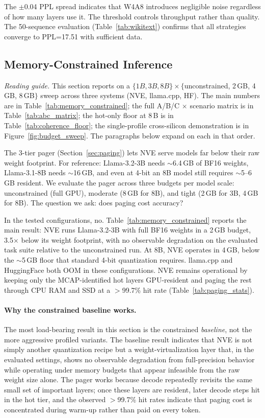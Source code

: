 \documentclass{article}
\begin{document}
The $\pm$0.04 PPL spread indicates that W4A8 introduces negligible noise
regardless of how many layers use it. The threshold controls throughput
rather than quality. The 50-sequence evaluation
(Table~\ref{tab:wikitext}) confirms that all strategies converge to
PPL=17.51 with sufficient data.


\subsection{Memory-Constrained Inference}
\label{sec:memory}

\emph{Reading guide.} This section reports on a $\{1B, 3B, 8B\} \times \{$unconstrained,
2\,GB, 4\,GB, 8\,GB$\}$ sweep across three systems (NVE, llama.cpp, HF). The main
numbers are in Table~\ref{tab:memory_constrained}; the full A/B/C $\times$ scenario
matrix is in Table~\ref{tab:abc_matrix}; the hot-only floor at 8\,B is in
Table~\ref{tab:coherence_floor}; the single-profile cross-silicon demonstration is in
Figure~\ref{fig:budget_sweep}. The paragraphs below expand on each in that order.

The 3-tier pager (Section~\ref{sec:paging}) lets NVE serve models far below their raw weight
footprint. For reference: Llama-3.2-3B needs $\sim$6.4\,GB of BF16 weights, Llama-3.1-8B
needs $\sim$16\,GB, and even at 4-bit an 8B model still requires $\sim$5--6\,GB
resident. We evaluate the pager across three budgets per model scale:
unconstrained (full GPU), moderate (8\,GB for 8B), and tight (2\,GB for 3B,
4\,GB for 8B). The question we ask: does paging cost accuracy?

In the tested configurations, no. Table~\ref{tab:memory_constrained} reports
the main result: NVE runs Llama-3.2-3B with full BF16 weights in a 2\,GB
budget, 3.5$\times$ below its weight footprint, with no observable
degradation on the evaluated task suite relative to the unconstrained run. At 8B, NVE operates in 4\,GB, below the
$\sim$5\,GB floor that standard 4-bit quantization requires. llama.cpp and
HuggingFace both OOM in these configurations. NVE remains operational by
keeping only the MCAP-identified hot layers GPU-resident and paging the rest
through CPU RAM and SSD at a $>$99.7\% hit rate
(Table~\ref{tab:paging_stats}).

\paragraph{Why the constrained baseline works.} The most load-bearing result
in this section is the constrained \emph{baseline}, not the more aggressive
profiled variants. The baseline result indicates that NVE is not simply
another quantization recipe but a weight-virtualization layer that, in the
evaluated settings, shows no observable degradation from full-precision
behavior while operating under memory budgets that appear infeasible from
the raw weight size alone. The pager works
because decode repeatedly revisits the same small set of important layers;
once these layers are resident, later decode steps hit in the hot tier, and
the observed $>$99.7\% hit rates indicate that paging cost is concentrated
during warm-up rather than paid on every token.
\end{document}
